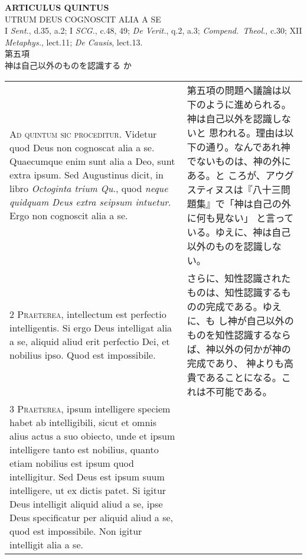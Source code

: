 \documentclass[10pt]{jsarticle} %
\begin{document}
\begin{center}
{\Large {\bf ARTICULUS QUINTUS}}\\ {\large UTRUM DEUS COGNOSCIT ALIA A
SE}\\ {\footnotesize I {\itshape Sent.}, d.35, a.2; I {\itshape
SCG.}, c.48, 49; {\itshape De Verit.}, q.2, a.3; {\itshape
Compend.~Theol.}, c.30; XII {\itshape Metaphys.}, lect.11; {\itshape
De Causis}, lect.13.}\\ {\Large 第五項\\神は自己以外のものを認識する
か}
\end{center}

\begin{longtable}{p{21em}p{21em}}

{\huge A}{\scshape d quintum sic proceditur}. Videtur quod Deus non
cognoscat alia a se. Quaecumque enim sunt alia a Deo, sunt extra
ipsum. Sed Augustinus dicit, in libro {\itshape Octoginta trium Qu}.,
quod {\itshape neque quidquam Deus extra seipsum intuetur}. Ergo non
cognoscit alia a se.


&

第五項の問題へ議論は以下のように進められる。神は自己以外を認識しないと
思われる。理由は以下の通り。なんであれ神でないものは、神の外にある。と
ころが、アウグスティヌスは『八十三問題集』で「神は自己の外に何も見ない」
と言っている。ゆえに、神は自己以外のものを認識しない。

\\


{\scshape 2 Praeterea}, intellectum est perfectio intelligentis. Si
ergo Deus intelligat alia a se, aliquid aliud erit perfectio Dei, et
nobilius ipso. Quod est impossibile.

&

さらに、知性認識されたものは、知性認識するものの完成である。ゆえに、も
し神が自己以外のものを知性認識するならば、神以外の何かが神の完成であり、
神よりも高貴であることになる。これは不可能である。


\\


{\scshape 3 Praeterea}, ipsum intelligere speciem habet ab
intelligibili, sicut et omnis alius actus a suo obiecto, unde et ipsum
intelligere tanto est nobilius, quanto etiam nobilius est ipsum quod
intelligitur. Sed Deus est ipsum suum intelligere, ut ex dictis
patet. Si igitur Deus intelligit aliquid aliud a se, ipse Deus
specificatur per aliquid aliud a se, quod est impossibile. Non igitur
intelligit alia a se.


&


\end{longtable}
\end{document}
